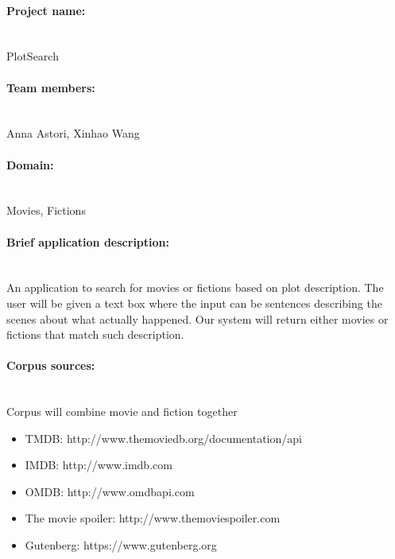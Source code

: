 \documentclass{article}
\begin{document}
	\paragraph*{Project name: } \ \\
	PlotSearch
	\paragraph*{Team members: } \ \\
	Anna Astori, Xinhao Wang
	\paragraph*{Domain: } \ \\
	Movies, Fictions
	\paragraph*{Brief application description: } \ \\
	An application to search for movies or fictions based on plot description. The user will be given a text box where the input can be sentences describing the scenes about what actually happened. Our system will return either movies or fictions that match such description. 
	\paragraph*{Corpus sources: } \ \\
	Corpus will combine movie and fiction together
    \begin{itemize}
    \item TMDB: http://www.themoviedb.org/documentation/api 
	\item IMDB: http://www.imdb.com
	\item OMDB: http://www.omdbapi.com
	\item The movie spoiler: http://www.themoviespoiler.com
	\item Gutenberg: https://www.gutenberg.org
    \end{itemize}
\end{document}
